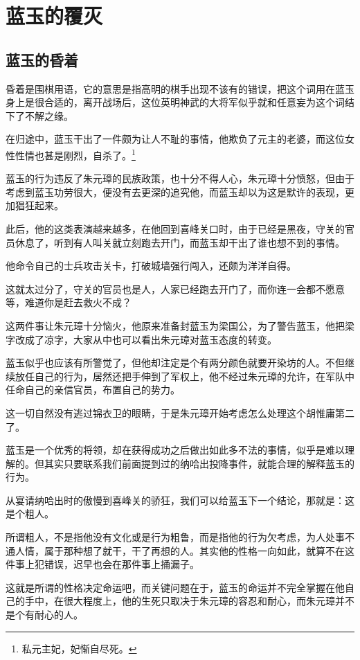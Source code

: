 \section{蓝玉的覆灭}
\ifnum{}
	\begin{multicols}{\theparacolNo}
		\fi
		\subsection{蓝玉的昏着}
		昏着是围棋用语，它的意思是指高明的棋手出现不该有的错误，把这个词用在蓝玉身上是很合适的，离开战场后，这位英明神武的大将军似乎就和任意妄为这个词结下了不解之缘。

		在归途中，蓝玉干出了一件颇为让人不耻的事情，他欺负了元主的老婆，而这位女性性情也甚是刚烈，自杀了。\footnote{私元主妃，妃惭自尽死。}

		蓝玉的行为违反了朱元璋的民族政策，也十分不得人心，朱元璋十分愤怒，但由于考虑到蓝玉功劳很大，便没有去更深的追究他，而蓝玉却以为这是默许的表现，更加猖狂起来。

		此后，他的这类表演越来越多，在他回到喜峰关口时，由于已经是黑夜，守关的官员休息了，听到有人叫关就立刻跑去开门，而蓝玉却干出了谁也想不到的事情。

		他命令自己的士兵攻击关卡，打破城墙强行闯入，还颇为洋洋自得。

		这就太过分了，守关的官员也是人，人家已经跑去开门了，而你连一会都不愿意等，难道你是赶去救火不成？

		这两件事让朱元璋十分恼火，他原来准备封蓝玉为梁国公，为了警告蓝玉，他把梁字改成了凉字，大家从中也可以看出朱元璋对蓝玉态度的转变。

		蓝玉似乎也应该有所警觉了，但他却注定是个有两分颜色就要开染坊的人。不但继续放任自己的行为，居然还把手伸到了军权上，他不经过朱元璋的允许，在军队中任命自己的亲信官员，布置自己的势力。

		这一切自然没有逃过锦衣卫的眼睛，于是朱元璋开始考虑怎么处理这个胡惟庸第二了。

		蓝玉是一个优秀的将领，却在获得成功之后做出如此多不法的事情，似乎是难以理解的。但其实只要联系我们前面提到过的纳哈出投降事件，就能合理的解释蓝玉的行为。

		从宴请纳哈出时的傲慢到喜峰关的骄狂，我们可以给蓝玉下一个结论，那就是：这是个粗人。

		所谓粗人，不是指他没有文化或是行为粗鲁，而是指他的行为欠考虑，为人处事不通人情，属于那种想了就干，干了再想的人。其实他的性格一向如此，就算不在这件事上犯错误，迟早也会在那件事上捅漏子。

		这就是所谓的性格决定命运吧，而关键问题在于，蓝玉的命运并不完全掌握在他自己的手中，在很大程度上，他的生死只取决于朱元璋的容忍和耐心，而朱元璋并不是个有耐心的人。


\end{multicols}

